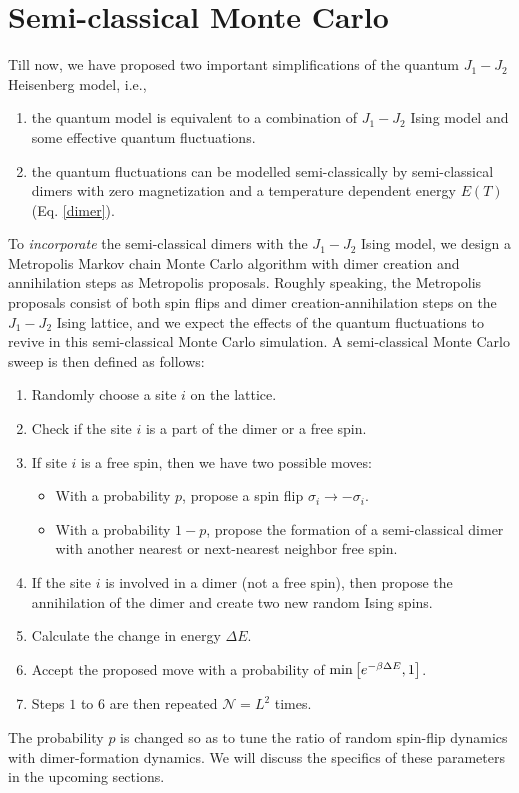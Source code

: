 \documentclass[../thesis_main.tex]{subfiles}
\begin{document}
\section{Semi-classical Monte Carlo} \label{SCMC}
Till now, we have proposed two important simplifications of the quantum $J_1-J_2$ Heisenberg model, i.e., 
\begin{enumerate}
    \item the quantum model is equivalent to a combination of $J_1-J_2$ Ising model and some effective quantum fluctuations.
    \item the quantum fluctuations can be modelled semi-classically by semi-classical dimers with zero magnetization and a temperature dependent energy $E(T)$ (Eq. \eqref{dimer}).
\end{enumerate}
To \textit{incorporate} the semi-classical dimers with the $J_1-J_2$ Ising model, we design a Metropolis Markov chain Monte Carlo algorithm with dimer creation and annihilation steps as Metropolis proposals. Roughly speaking, the Metropolis proposals consist of both spin flips and dimer creation-annihilation steps on the $J_1-J_2$ Ising lattice, and we expect the effects of the quantum fluctuations to revive in this semi-classical Monte Carlo simulation. A semi-classical Monte Carlo sweep is then defined as follows:
\begin{enumerate}
    \setlength\itemsep{0.1em}
    \item Randomly choose a site $i$ on the lattice.
    \item Check if the site $i$ is a part of the dimer or a free spin. 
    
    \item If site $i$ is a free spin, then we have two possible moves:
    \begin{itemize}[label={\textbf{--}}]
        \setlength{\itemsep}{0.1em}
        \item With a probability $p$, propose a spin flip $\sigma_i \to -\sigma_i$.
        \item With a probability $1-p$, propose the formation of a semi-classical dimer with another nearest or next-nearest neighbor free spin.
    \end{itemize}
    \item If the site $i$ is involved in a dimer (not a free spin), then propose the annihilation of the dimer and create two new random Ising spins. 
    \item Calculate the change in energy $\Delta E$. 
    \item Accept the proposed move with a probability of $\min \qty[e^{-\beta \Delta E}, 1]$.
    \item Steps $1$ to $6$ are then repeated $\mathcal{N} = L^2$ times.
\end{enumerate}
The probability $p$ is changed so as to tune the ratio of random spin-flip dynamics with dimer-formation dynamics. We will discuss the specifics of these parameters in the upcoming sections.
\end{document}
